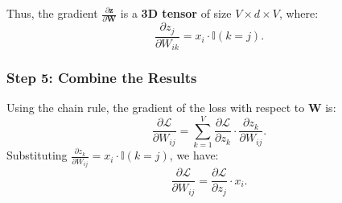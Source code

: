 \begin{notechapter}
Thus, the gradient \(\frac{\partial \mathbf{z}}{\partial \mathbf{W}}\)
is a \textbf{3D tensor} of size \(V \times d \times V\), where:
\[
\frac{\partial z_j}{\partial W_{ik}} = x_i \cdot \mathbb{I}(k = j).
\]

\subsubsection{Step 5: Combine the Results}
Using the chain rule, the gradient of the loss with respect to
\(\mathbf{W}\) is:
\[
\frac{\partial \mathcal{L}}{\partial W_{ij}} = 
\sum_{k=1}^V \frac{\partial \mathcal{L}}{\partial z_k} \cdot \frac{\partial z_k}{\partial W_{ij}}.
\]
Substituting \(\frac{\partial z_k}{\partial W_{ij}} = x_i \cdot \mathbb{I}(k = j)\), we have:
\[
\frac{\partial \mathcal{L}}{\partial W_{ij}} = 
\frac{\partial \mathcal{L}}{\partial z_j} \cdot x_i.
\]


\end{notechapter}
